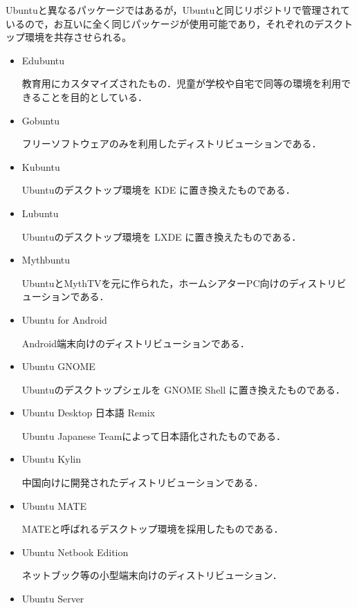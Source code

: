 Ubuntuと異なるパッケージではあるが，Ubuntuと同じリポジトリで管理されているので，お互いに全く同じパッケージが使用可能であり，それぞれのデスクトップ環境を共存させられる。

\begin{itemize}
\setlength{\parskip}{3mm}

 \item	Edubuntu

教育用にカスタマイズされたもの．児童が学校や自宅で同等の環境を利用できることを目的としている．

 \item	Gobuntu

フリーソフトウェアのみを利用したディストリビューションである．

 \item	Kubuntu

Ubuntuのデスクトップ環境を KDE に置き換えたものである．

 \item	Lubuntu

Ubuntuのデスクトップ環境を LXDE に置き換えたものである．

 \item	Mythbuntu

UbuntuとMythTVを元に作られた，ホームシアターPC向けのディストリビューションである．

 \item	Ubuntu for Android

Android端末向けのディストリビューションである．

 \item	Ubuntu GNOME

Ubuntuのデスクトップシェルを GNOME Shell に置き換えたものである．

 \item	Ubuntu Desktop 日本語 Remix

Ubuntu Japanese Teamによって日本語化されたものである．

 \item	Ubuntu Kylin

中国向けに開発されたディストリビューションである．

 \item	Ubuntu MATE

MATEと呼ばれるデスクトップ環境を採用したものである．

 \item	Ubuntu Netbook Edition

ネットブック等の小型端末向けのディストリビューション．

 \item	Ubuntu Server


\end{itemize}
